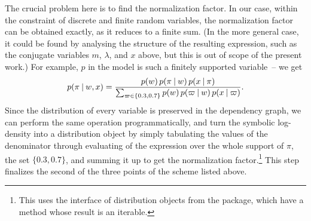 The crucial problem here is to find the normalization factor.  In our case, within the constraint of
discrete and finite random variables, the normalization factor can be obtained exactly, as it
reduces to a finite sum.  (In the more general case, it could be found by analysing the structure of
the resulting expression, such as the conjugate variables \(m\), \(\lambda\), and \(x\) above, but
this is out of scope of the present work.)  For example, \(p\) in the 
model is such a finitely supported variable~-- we get
\begin{equation}
    p(\pi \:\vert\: w, x) = \frac{p(w) \, p(\pi \:\vert\: w) \, p(x \:\vert\: \pi)}{
      \sum_{\varpi \in \{0.3, 0.7\}}p(w) \, p(\varpi \:\vert\: w) \, p(x \:\vert\: \varpi)}.
\end{equation}
Since the distribution of every variable is preserved in the dependency graph, we can perform the
same operation programmatically, and turn the symbolic log-density into a distribution object by
simply tabulating the values of the denominator through evaluating of the expression over the whole
support of \(\pi\), the set \(\{0.3, 0.7\}\), and summing it up to get the normalization
factor.\footnote{This uses the interface of distribution objects from the
   package, which have a  method whose result is an
  iterable.}  This step finalizes the second of the three points of the scheme listed above.

